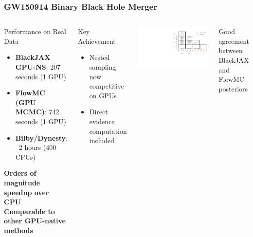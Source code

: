 \documentclass[aspectratio=169]{beamer}
\begin{document}
\begin{frame}
    \frametitle{GW150914 Binary Black Hole Merger}
    \begin{columns}
        \begin{block}{Performance on Real Data}
            \begin{itemize}
                \item \textbf{BlackJAX GPU-NS}: 207 seconds (1 GPU)
                \item \textbf{FlowMC (GPU MCMC)}: 742 seconds (1 GPU)
                \item \textbf{Bilby/Dynesty}: ~2 hours (400 CPUs)
            \end{itemize}
            \begin{center}
                \textbf{Orders of magnitude speedup over CPU}\\
                \textbf{Comparable to other GPU-native methods}
            \end{center}
            \vspace{5pt}
        \end{block}
        \begin{block}{Key Achievement}
            \begin{itemize}
                \item Nested sampling now competitive on GPUs
                \item Direct evidence computation included
            \end{itemize}
        \end{block}
        \includegraphics[width=\textwidth]{figures/gw_corner.pdf}
        \vspace{5pt}
        \begin{center}
            \small{Good agreement between BlackJAX\\and FlowMC posteriors}
        \end{center}
    \end{columns}
\end{frame}
\end{document}
